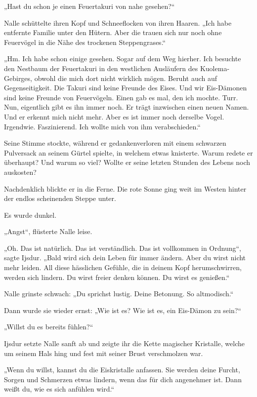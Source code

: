 „Hast du schon je einen Feuertakuri von nahe gesehen?“

Nalle schüttelte ihren Kopf und Schneeflocken von ihren Haaren. „Ich habe entfernte Familie unter den Hütern. Aber die trauen sich nur noch ohne Feuervögel in die Nähe des trockenen Steppengrases.“

„Hm. Ich habe schon einige gesehen. Sogar auf dem Weg hierher. Ich besuchte den Nestbaum der Feuertakuri in den westlichen Ausläufern des Kuolema-Gebirges, obwohl die mich dort nicht wirklich mögen. Beruht auch auf Gegenseitigkeit. Die Takuri sind keine Freunde des Eises. Und wir Eis-Dämonen sind keine Freunde von Feuervögeln. Einen gab es mal, den ich mochte. Turr. Nun, eigentlich gibt es ihn immer noch. Er trägt inzwischen einen neuen Namen. Und er erkennt mich nicht mehr. Aber es ist immer noch derselbe Vogel. Irgendwie. Faszinierend. Ich wollte mich von ihm verabschieden.“

Seine Stimme stockte, während er gedankenverloren mit einem schwarzen Pulversack an seinem Gürtel spielte, in welchem etwas knisterte. Warum redete er überhaupt? Und warum so viel? Wollte er seine letzten Stunden des Lebens noch auskosten?

Nachdenklich blickte er in die Ferne. Die rote Sonne ging weit im Westen hinter der endlos scheinenden Steppe unter.

Es wurde dunkel.

„Angst“, flüsterte Nalle leise.

„Oh. Das ist natürlich. Das ist verständlich. Das ist vollkommen in Ordnung“, sagte Ijsdur. „Bald wird sich dein Leben für immer ändern. Aber du wirst nicht mehr leiden. All diese hässlichen Gefühle, die in deinem Kopf herumschwirren, werden sich lindern. Du wirst freier denken können. Du wirst es genießen.“

Nalle grinste schwach: „Du sprichst lustig. Deine Betonung. So altmodisch.“

Dann wurde sie wieder ernst: „Wie ist es? Wie ist es, ein Eis-Dämon zu sein?“

„Willst du es bereits fühlen?“

Ijsdur setzte Nalle sanft ab und zeigte ihr die Kette magischer Kristalle, welche um seinem Hals hing und fest mit seiner Brust verschmolzen war.

„Wenn du willst, kannst du die Eiskristalle anfassen. Sie werden deine Furcht, Sorgen und Schmerzen etwas lindern, wenn das für dich angenehmer ist. Dann weißt du, wie es sich anfühlen wird.“


